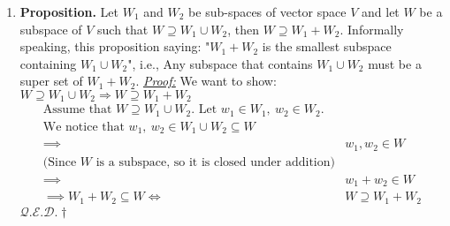 \documentclass[oneside, 12pt]{book}
\newcommand{\settag}[1]{\renewcommand{\theenumi}{#1}}
\newcommand{\qed}{\hfill $\mathcal{Q}.\mathcal{E}.\mathcal{D}.\dagger$}
\newcommand{\tit}[1]{\textit{#1}}
\newcommand{\proof}{\tit{\underline{Proof:}}} %
\begin{document}
\begin{enumerate}
        \settag{1.3.11}
        \item \textbf{Proposition.} Let $W_1$ and $W_2$ be sub-spaces of vector space $V$ and let $W$ be a subspace of $V$ such that $W\supseteq W_1 \cup W_2$, then $W\supseteq W_1 + W_2$. Informally speaking, this proposition saying: "$W_1+W_2$ is the smallest subspace containing $W_1\cup W_2$", i.e., Any subspace that contains $W_1\cup W_2$ must be a super set of $W_1 + W_2$. \newline
        \proof\newline
        We want to show: $W\supseteq W_1\cup W_2\Longrightarrow W\supseteq W_1 + W_2$\newline
            \begin{align*}
                \text{Assume that } \text{$W\supseteq W_1 \cup W_2$. Let $w_1\in W_1,~w_2\in W_2$.}\\
                \text{We notice that } w_1,~w_2\in W_1\cup W_2 \subseteq W \\
                \implies& w_1, w_2\in W \\
                \text{(Since $W$ is a subspace, so it is closed under addition)}\\
                \implies& w_1 + w_2 \in W\\
                \implies W_1 + W_2 \subseteq W \iff& W \supseteq W_1 + W_2 
            \end{align*}
            \qed
        
    \end{enumerate}
\end{document}
